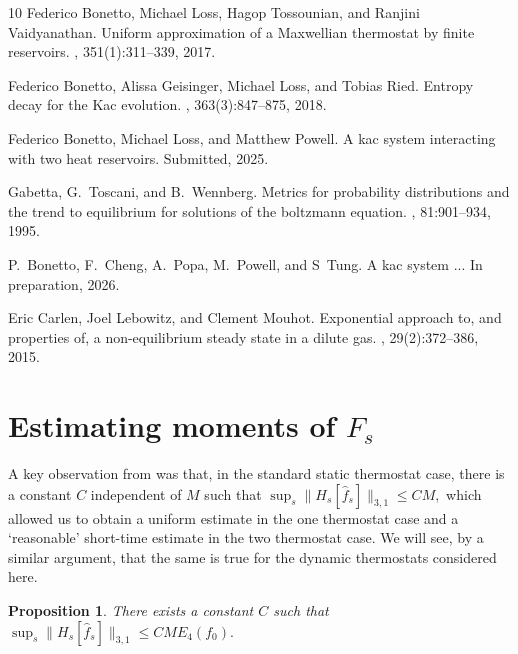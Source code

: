 \documentclass{article}
\newtheorem{Prop}{Proposition}
\begin{document}
\begin{thebibliography}{10}
Federico Bonetto, Michael Loss, Hagop Tossounian, and Ranjini Vaidyanathan.
\newblock Uniform approximation of a {M}axwellian thermostat by finite
  reservoirs.
, 351(1):311--339, 2017.

Federico Bonetto, Alissa Geisinger, Michael Loss, and Tobias Ried.
\newblock Entropy decay for the {K}ac evolution.
, 363(3):847--875, 2018.

Federico Bonetto, Michael Loss, and Matthew Powell.
\newblock A kac system interacting with two heat reservoirs.
\newblock Submitted, 2025.

Gabetta, G.~Toscani, and B.~Wennberg.
\newblock Metrics for probability distributions and the trend to equilibrium
  for solutions of the boltzmann equation.
, 81:901--934, 1995.

P.~Bonetto, F.~Cheng, A.~Popa, M.~Powell, and S~Tung.
\newblock A kac system ...
\newblock In preparation, 2026.

Eric Carlen, Joel Lebowitz, and Clement Mouhot.
\newblock Exponential approach to, and properties of, a non-equilibrium steady
  state in a dilute gas.
,
  29(2):372--386, 2015.

\end{thebibliography}


\appendix




\section{Estimating moments of $F_s$}\label{app:moments}


A key observation from \cite{BLP25} was that, in the standard static thermostat case, there is a constant $C$ 
independent of $M$ such that $\sup_s \|H_s[\hat{f}_s]\|_{3,1} \leq CM,$ which allowed us to obtain a uniform estimate 
in the one 
thermostat case and a `reasonable' short-time estimate in the two thermostat case. We will see, by a similar argument, 
that the same is true for the dynamic thermostats considered here.
 
\begin{Prop}\label{prop:H31}
 	There exists a constant $C$ such that $\sup_s \|H_s[\hat{f}_s]\|_{3,1} \leq CM E_4(f_0).$
\end{Prop}
\end{document}
